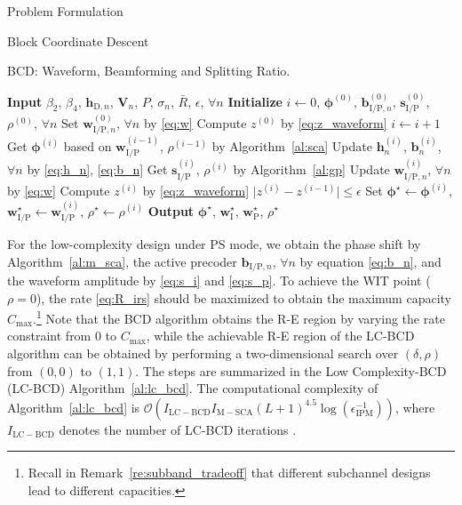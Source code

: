 \documentclass[journal]{IEEEtran}
\begin{document}
\begin{section}{Problem Formulation}
\begin{subsection}{Block Coordinate Descent}
			\begin{algorithm}[!t]
				\caption{BCD: Waveform, Beamforming and Splitting Ratio.}
				\label{al:bcd}
				\begin{algorithmic}[1]
					\State \textbf{Input} $\beta_2$, $\beta_4$, $\boldsymbol{h}_{\mathrm{D},n}$, $\boldsymbol{V}_{n}$, $P$, $\sigma_n$, $\bar{R}$, $\epsilon$, $\forall n$
					\State \textbf{Initialize} $i \gets 0$, $\boldsymbol{\phi}^{(0)}$, $\boldsymbol{b}_{\mathrm{I/P},n}^{(0)}$, $\boldsymbol{s}_{\mathrm{I/P}}^{(0)}$, $\rho^{(0)}$, $\forall n$
					\State Set $\boldsymbol{w}_{\mathrm{I/P},n}^{(0)}$, $\forall n$ by \eqref{eq:w}
					\State Compute $z^{(0)}$ by \eqref{eq:z_waveform}
					\Repeat
						\State $i \gets i + 1$
						\State Get $\boldsymbol{\phi}^{(i)}$ based on $\boldsymbol{w}_{\mathrm{I/P}}^{(i-1)}$, $\rho^{(i-1)}$ by Algorithm~\ref{al:sca}
						\State Update $\boldsymbol{h}_n^{(i)}$, $\boldsymbol{b}_n^{(i)}$, $\forall n$ by \eqref{eq:h_n}, \eqref{eq:b_n}
						\State Get $\boldsymbol{s}_{\mathrm{I/P}}^{(i)}$, $\rho^{(i)}$ by Algorithm~\ref{al:gp}
						\State Update $\boldsymbol{w}_{\mathrm{I/P},n}^{(i)}$, $\forall n$ by \eqref{eq:w}
						\State Compute $z^{(i)}$ by \eqref{eq:z_waveform}
					\Until $\lvert z^{(i)} - z^{(i-1)} \rvert \le \epsilon$
					\State Set $\boldsymbol{\phi}^{\star} \gets \boldsymbol{\phi}^{(i)}$, $\boldsymbol{w}_{\mathrm{I/P}}^{\star} \gets \boldsymbol{w}_{\mathrm{I/P}}^{(i)}$, $\rho^{\star} \gets \rho^{(i)}$
					\State \textbf{Output} $\boldsymbol{\phi}^{\star}$, $\boldsymbol{w}_{\mathrm{I}}^{\star}$, $\boldsymbol{w}_{\mathrm{P}}^{\star}$, $\rho^{\star}$
				\end{algorithmic}
			\end{algorithm}

			For the low-complexity design under PS mode, we obtain the phase shift by Algorithm~\ref{al:m_sca}, the active precoder $\boldsymbol{b}_{\mathrm{I/P},n}$, $\forall n$ by equation \eqref{eq:b_n}, and the waveform amplitude by \eqref{eq:s_i} and \eqref{eq:s_p}. To achieve the WIT point ($\rho=0$), the rate \eqref{eq:R_irs} should be maximized to obtain the maximum capacity $C_{\max}$.\footnote{Recall in Remark~\ref{re:subband_tradeoff} that different subchannel designs lead to different capacities.} Note that the BCD algorithm obtains the R-E region by varying the rate constraint from \num{0} to $C_{\max}$, while the achievable R-E region of the LC-BCD algorithm can be obtained by performing a two-dimensional search over $(\delta, \rho)$ from $(0, 0)$ to $(1, 1)$. The steps are summarized in the Low Complexity-BCD (LC-BCD) Algorithm~\ref{al:lc_bcd}. The computational complexity of Algorithm~\ref{al:lc_bcd} is $\mathcal{O}\left(I_{\mathrm{LC-BCD}}I_{\mathrm{M-SCA}}(L+1)^{4.5} \log(\epsilon_{\mathrm{IPM}}^{-1})\right)$, where $I_{\mathrm{LC-BCD}}$ denotes the number of LC-BCD iterations \cite{Luo2010b}.


\end{subsection}
\end{section}
\end{document}
